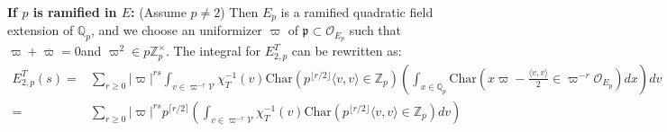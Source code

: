 \documentclass[12pt]{article}
\theoremstyle{remark}
\theoremstyle{definition}
\newcommand{\oo}{\mathcal{O}}
\newcommand{\Z}{\mathbb{Z}}
\newcommand{\Q}{\mathbb{Q}}
\newcommand{\lrangle}[2]{\langle #1,#2\rangle}
\newcommand{\rmm}[1]{\mathrm{#1}}
\newcommand{\call}[1]{\mathcal{#1}}
\newcommand{\frakk}[1]{\mathfrak{#1}}
\begin{document}
\textbf{If $p$ is ramified in $E$:}
(Assume $p\neq 2$)
Then $E_{p}$ is a ramified quadratic field extension of $\Q_{p}$,
and we choose an uniformizer $\varpi$ of $\frakk{p}\subset\oo_{E_{p}}$ such that $\varpi+\overline{\varpi}=0$and $\varpi^{2}\in p\Z_{p}^{\times}$.
The integral for $E_{2,p}^{T}$ can be rewritten as:
\begin{align*}
    E_{2,p}^{T}(s)=&\sum_{r\geq 0}|\varpi|^{rs}\int_{v\in \varpi^{-r}\call{V}}\chi_{T}^{-1}(v)\rmm{Char}(p^{\lfloor r/2\rfloor}\lrangle{v}{v}\in \Z_{p})\left(\int_{x\in\Q_{p}}\rmm{Char}(x\varpi-\frac{\lrangle{v}{v}}{2}\in \varpi^{-r}\oo_{E_{p}})dx\right)dv\\
    =&\sum_{r\geq 0}|\varpi|^{rs}p^{\lceil r/2 \rceil}\left(\int_{v\in \varpi^{-r}\call{V}}\chi_{T}^{-1}(v)\rmm{Char}(p^{\lfloor r/2\rfloor}\lrangle{v}{v}\in\Z_{p})dv\right)
\end{align*} 
\end{document}
